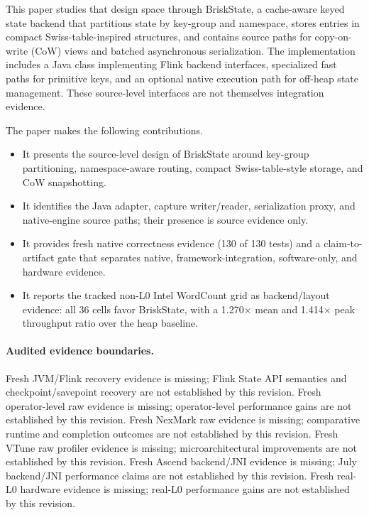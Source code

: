 \documentclass[journal]{IEEEtran}
\newcommand{\briskstate}{BriskState\xspace}
\newcommand{\system}{\briskstate}
\begin{document}
This paper studies that design space through \system, a cache-aware keyed state backend that partitions state by key-group and namespace, stores entries in compact Swiss-table-inspired structures, and contains source paths for copy-on-write (CoW) views and batched asynchronous serialization. The implementation includes a Java class implementing Flink backend interfaces, specialized fast paths for primitive keys, and an optional native execution path for off-heap state management. These source-level interfaces are not themselves integration evidence.

The paper makes the following contributions.
\begin{itemize}
\item It presents the source-level design of \system around key-group partitioning, namespace-aware routing, compact Swiss-table-style storage, and CoW snapshotting.
\item It identifies the Java adapter, capture writer/reader, serialization proxy, and native-engine source paths; their presence is source evidence only.
\item It provides fresh native correctness evidence (130 of 130 tests) and a claim-to-artifact gate that separates native, framework-integration, software-only, and hardware evidence.
\item It reports the tracked non-L0 Intel WordCount grid as backend/layout evidence: all 36 cells favor \system, with a 1.270$\times$ mean and 1.414$\times$ peak throughput ratio over the heap baseline.
\end{itemize}

\paragraph{Audited evidence boundaries.}
Fresh JVM/Flink recovery evidence is missing; Flink State API semantics and checkpoint/savepoint recovery are not established by this revision.
Fresh operator-level raw evidence is missing; operator-level performance gains are not established by this revision.
Fresh NexMark raw evidence is missing; comparative runtime and completion outcomes are not established by this revision.
Fresh VTune raw profiler evidence is missing; microarchitectural improvements are not established by this revision.
Fresh Ascend backend/JNI evidence is missing; July backend/JNI performance claims are not established by this revision.
Fresh real-L0 hardware evidence is missing; real-L0 performance gains are not established by this revision.
\end{document}

